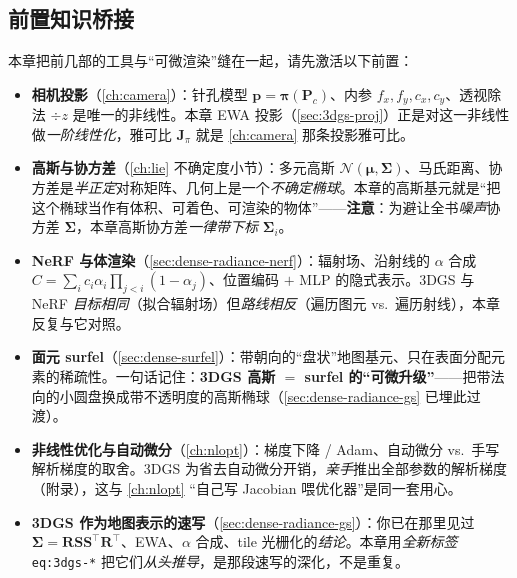 \subsection*{前置知识桥接}
本章把前几部的工具与“可微渲染”缝在一起，请先激活以下前置：
\begin{itemize}
  \item \textbf{相机投影}（\cref{ch:camera}）：针孔模型 $\mathbf p=\boldsymbol\pi(\mathbf P_c)$、内参 $f_x,f_y,c_x,c_y$、透视除法 $\div z$ 是唯一的非线性。本章 EWA 投影（\cref{sec:3dgs-proj}）正是对这一非线性做\emph{一阶线性化}，雅可比 $\mathbf J_\pi$ 就是 \cref{ch:camera} 那条投影雅可比。
  \item \textbf{高斯与协方差}（\cref{ch:lie} 不确定度小节）：多元高斯 $\mathcal N(\boldsymbol\mu,\boldsymbol\Sigma)$、马氏距离、协方差是\emph{半正定}对称矩阵、几何上是一个\emph{不确定椭球}。本章的高斯基元就是“把这个椭球当作有体积、可着色、可渲染的物体”——\textbf{注意}：为避让全书\emph{噪声}协方差 $\boldsymbol\Sigma$，本章高斯协方差\emph{一律带下标} $\boldsymbol\Sigma_i$。
  \item \textbf{NeRF 与体渲染}（\cref{sec:dense-radiance-nerf}）：辐射场、沿射线的 $\alpha$ 合成 $C=\sum_i c_i\alpha_i\prod_{j<i}(1-\alpha_j)$、位置编码 $+$ MLP 的隐式表示。3DGS 与 NeRF \emph{目标相同}（拟合辐射场）但\emph{路线相反}（遍历图元 vs.\ 遍历射线），本章反复与它对照。
  \item \textbf{面元 surfel}（\cref{sec:dense-surfel}）：带朝向的“盘状”地图基元、只在表面分配元素的稀疏性。一句话记住：\textbf{3DGS 高斯 $=$ surfel 的“可微升级”}——把带法向的小圆盘换成带不透明度的高斯椭球（\cref{sec:dense-radiance-gs} 已埋此过渡）。
  \item \textbf{非线性优化与自动微分}（\cref{ch:nlopt}）：梯度下降 / Adam、自动微分 vs.\ 手写解析梯度的取舍。3DGS 为省去自动微分开销，\emph{亲手}推出全部参数的解析梯度（附录），这与 \cref{ch:nlopt} “自己写 Jacobian 喂优化器”是同一套用心。
  \item \textbf{3DGS 作为地图表示的速写}（\cref{sec:dense-radiance-gs}）：你已在那里见过 $\boldsymbol\Sigma=\mathbf R\mathbf S\mathbf S^\top\mathbf R^\top$、EWA、$\alpha$ 合成、tile 光栅化的\emph{结论}。本章用\emph{全新标签} \texttt{eq:3dgs-*} 把它们\emph{从头推导}，是那段速写的深化，不是重复。
\end{itemize}

